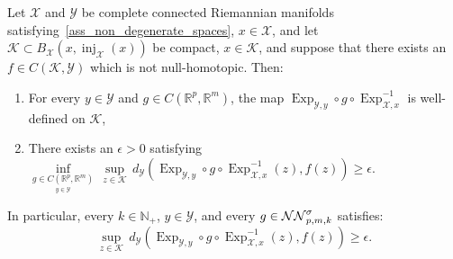 \documentclass[anon,12pt]{colt2021} %
\newcommand{\rr}{{\mathbb{R}}}
\newcommand{\rrflex}[1]{{\ensuremath{\rr^{#1}
}}}
\newcommand{\rrm}{{\rrflex{m}}}
\newcommand{\rrp}{{\rrflex{p}}}
\newcommand{\xxx}{\mathcal{X}}
\newcommand{\yyy}{\mathcal{Y}}
\newcommand{\nn}{{\mathbb{N}}}
\newcommand{\kkk}{{\mathscr{K}}}
\begin{document}
\begin{theorem}\label{thrm_homotopic_necessary_condition}
Let $\xxx$ and $\yyy$ be complete connected Riemannian manifolds satisfying~\eqref{ass_non_degenerate_spaces}, $x \in \xxx$, and let $\kkk\subset B_{\xxx}(x,\operatorname{inj}_{\xxx}(x))$ be  compact, $x\in \kkk$, and suppose that there exists an $f\in C(\kkk,\yyy)$ which is not null-homotopic.  Then:
\begin{enumerate}[label=(i),leftmargin=1.75em]
    \item For every $y \in \yyy$ and $g \in C(\rrp,\rrm)$, the map $\operatorname{Exp}_{\yyy,y}\circ g\circ \operatorname{Exp}_{\xxx,x}^{-1}$ is well-defined on $\kkk$,
    \item There exists an $\epsilon>0$ satisfying $
    \underset{
\underset{
y \in \yyy
}
{
g \in C(\rrp,\rrm)
}
}{\inf}\,
\underset{z \in \kkk}
{\sup}\,
d_{\yyy}\left(
\operatorname{Exp}_{\yyy,y}\circ g \circ \operatorname{Exp}_{\xxx,x}^{-1}(z),f(z)
\right)\geq \epsilon
.
$
\end{enumerate}
In particular, every $k \in \nn_+$, $y \in \yyy$, and every $g \in \NN[p,m,k]$ satisfies:
$$
\underset{
{z \in \kkk}
}{\sup}\,
d_{\yyy}\left(
\operatorname{Exp}_{\yyy,y}\circ g \circ \operatorname{Exp}_{\xxx,x}^{-1}(z),f(z)
\right)\geq \epsilon.
$$
\end{theorem}
\end{document}
